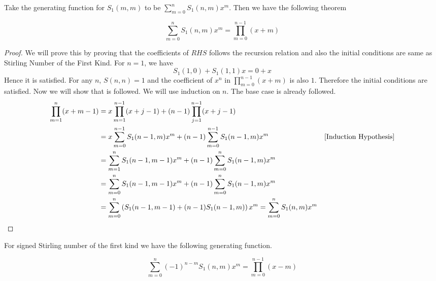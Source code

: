 Take the generating function for $S_1(m,m)$ to be $\sum\limits_{m=0}^nS_1(n,m)x^m$. Then we have the following theorem
\begin{Theorem}{}{}
	$$\sum\limits_{m=0}^nS_1(n,m)x^m=\prod_{m=0}^{n-1}(x+m)$$
\end{Theorem}
\begin{proof}
	We will prove this by proving that the coefficients of $RHS$ follows the recursion relation   and also the initial conditions are same as Stirling Number of the First Kind. For $n=1$, we have $$S_1(1,0)+S_1(1,1)x=0+x$$Hence it is satisfied. For any $n$, $S(n,n)=1$ and the coefficient of $x^n$ in $\prod_{m=0}^{n-1}(x+m)$ is also $1$. Therefore the initial conditions are satisfied. Now we will show that  is followed. We will use induction on $n$. The base case is already followed. \begin{align*}
		\prod_{m=1}^{n}(x+m-1) & = x\prod_{m=1}^{n-1}(x+j-1)+(n-1)\prod_{j=1}^{n-1}(x+j-1)\\
		& = x\sum_{m=0}^{n-1}S_1(n-1,m)x^{m}+(n-1)\sum_{m=0}^{n-1}S_1(n-1,m)x^m & [\text{Induction Hypothesis}]\\
		& = \sum_{m=1}^{n}S_1(n-1,m-1)x^{m}+(n-1)\sum_{m=0}^{n}S_1(n-1,m)x^m\\
		& = \sum_{m=0}^{n}S_1(n-1,m-1)x^{m}+(n-1)\sum_{m=0}^{n}S_1(n-1,m)x^m\\
		& = \sum_{m=0}^n\left(S_1(n-1,m-1)+(n-1)S_1(n-1,m)\right)x^m= \sum_{m=0}^nS_1(n,m)x^m
	\end{align*}
\end{proof}
For signed Stirling number of the first kind we have the following generating function. 
\begin{Theorem}{}{}
	$$\sum\limits_{m=0}^n(-1)^{n-m}S_1(n,m)x^m=\prod_{m=0}^{n-1}(x-m)$$
\end{Theorem}

